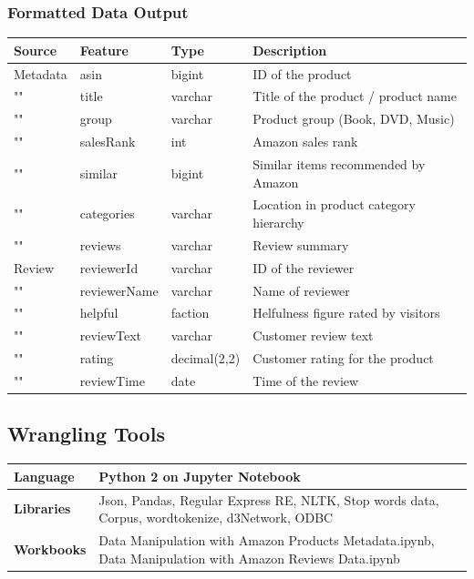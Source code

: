 \documentclass[a4paper,11pt]{article}
\begin{document}
		\subsubsection{Formatted Data Output}
		\begin{tabular}{|>{\centering\arraybackslash}p{2cm}|>{\centering\arraybackslash}p{2.5cm}|>{\centering\arraybackslash}p{2cm}||>{\arraybackslash}p{8cm}|}
		\hline 
		\textbf{Source} & \textbf{Feature} & \textbf{Type} & \textbf{Description} \\
		\hline 
		Metadata & asin & bigint & ID of the product \\ 
		\hline 
		"" & title & varchar & Title of the product / product name \\ 
		\hline 
		"" & group & varchar & Product group (Book, DVD, Music) \\ 
		\hline 
		"" & salesRank & int & Amazon sales rank \\ 
		\hline 
		"" & similar & bigint & Similar items recommended by Amazon \\ 
		\hline 
		"" & categories & varchar & Location in product category hierarchy \\ 
		\hline 
		"" & reviews & varchar & Review summary \\ 
		\hline 
		Review & reviewerId & varchar & ID of the reviewer \\ 
		\hline 
		"" & reviewerName & varchar & Name of reviewer \\ 
		\hline 
		"" & helpful & faction & Helfulness figure rated by visitors \\ 
		\hline 
		"" & reviewText & varchar & Customer review text \\ 
		\hline 
		"" & rating & decimal(2,2) & Customer rating for the product \\ 
		\hline 
		"" & reviewTime & date & Time of the review \\ 
		\hline
		\end{tabular} 
	
	\subsection{Wrangling Tools}
		\begin{tabular}{|>{\centering\arraybackslash}p{4cm}||>{\centering\arraybackslash}p{11.5cm}|}
			\hline 
			\textbf{Language} & Python 2 on Jupyter Notebook \\ 
			\hline 
			\textbf{Libraries} & Json, Pandas, Regular Express RE, NLTK, Stop words data, Corpus, wordtokenize, d3Network, ODBC \\ 
			\hline 
			\textbf{Workbooks} & Data Manipulation with Amazon Products Metadata.ipynb, Data Manipulation with Amazon Reviews Data.ipynb \\ 
			\hline 
			\end{tabular} 	
	
\end{document}
